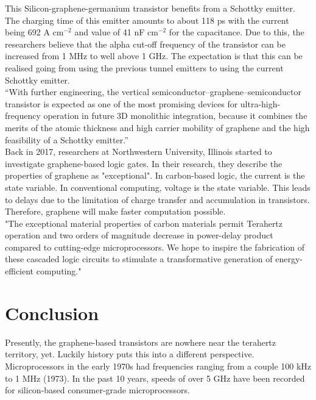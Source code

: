 \documentclass[conference, 10pt]{IEEEtran}
\begin{document}
This Silicon-graphene-germanium transistor benefits from a Schottky emitter. The charging time of this emitter amounts to about 118 ps with the current being 692 A cm$^{-2}$ and value of 41 nF cm$^{-2}$ for the capacitance. Due to this, the researchers believe that the alpha cut-off frequency of the transistor can be increased from 1 MHz to well above 1 GHz. The expectation is that this can be realised going from using the previous tunnel emitters to using the current Schottky emitter.\cite{article1}\\

``With further engineering, the vertical semiconductor–graphene–semiconductor transistor is expected as one of the most promising devices for ultra-high-frequency operation in future 3D monolithic integration, because it combines the merits of the atomic thickness and high carrier mobility of graphene and the high feasibility of a Schottky emitter.'' \cite{article1}\\

Back in 2017, researchers at Northwestern University, Illinois started to investigate graphene-based logic gates. In their research, they describe the properties of graphene as "exceptional". In carbon-based logic, the current is the state variable. In conventional computing, voltage is the state variable. This leads to delays due to the limitation of charge transfer and accumulation in transistors. Therefore, graphene will make faster computation possible.\cite{article2}\\

"The exceptional material properties of carbon materials permit Terahertz operation and two orders of magnitude decrease in power-delay product compared to cutting-edge microprocessors. We hope to inspire the fabrication of these cascaded logic circuits to stimulate a transformative generation of energy-efficient computing." \cite{article2}\\

\section{Conclusion}
Presently, the graphene-based transistors are nowhere near the terahertz territory, yet. Luckily history puts this into a different perspective. Microprocessors in the early 1970s had frequencies ranging from a couple 100 kHz to 1 MHz (1973). In the past 10 years, speeds of over 5 GHz have been recorded for silicon-based consumer-grade microprocessors. \cite{Microprocessor}\\
\end{document}
